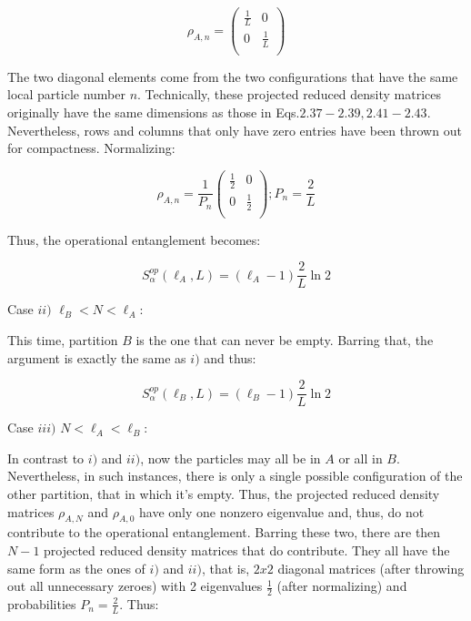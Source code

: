 \begin{equation}
\rho_{A,n} = \begin{pmatrix} 

\frac{1}{L} & 0 \\
0 & \frac{1}{L} \\

\end{pmatrix}
\end{equation}

The two diagonal elements come from the two configurations that have the same local particle number $n$. Technically, these projected reduced density matrices originally have the same dimensions as those in Eqs.$2.37-2.39,2.41-2.43$. Nevertheless, rows and columns that only have zero entries have been thrown out for compactness. Normalizing:

\begin{equation}
\rho_{A,n} = \frac{1}{P_n} \begin{pmatrix} 

\frac{1}{2} & 0 \\
0 & \frac{1}{2} \\

\end{pmatrix} ; P_n = \frac{2}{L}
\end{equation}

Thus, the operational entanglement becomes:

\begin{equation}
S_{\alpha}^{op} (\ell_A, L) = (\ell_{A} - 1) \frac{2}{L} \ln{2}
\end{equation}

Case $ii)$ $\ell_{B} < N < \ell_{A}$:

This time, partition $B$ is the one that can never be empty. Barring that, the argument is exactly the same as $i)$ and thus:

\begin{equation}
S_{\alpha}^{op} (\ell_{B}, L) = (\ell_{B} - 1) \frac{2}{L} \ln{2}
\end{equation}

Case $iii)$ $N < \ell_{A} < \ell_{B}$:

In contrast to $i)$ and $ii)$, now the particles may all be in $A$ or all in $B$. Nevertheless, in such instances, there is only a single possible configuration of the other partition, that in which it's empty. Thus, the projected reduced density matrices $\rho_{A,N}$ and $\rho_{A,0}$ have only one nonzero eigenvalue and, thus, do not contribute to the operational entanglement. Barring these two, there are then $N-1$ projected reduced density matrices that do contribute. They all have the same form as the ones of $i)$ and $ii)$, that is, $2x2$ diagonal matrices (after throwing out all unnecessary zeroes) with 2 eigenvalues $\frac{1}{2}$ (after normalizing) and probabilities $P_n = \frac{2}{L}$. Thus:

